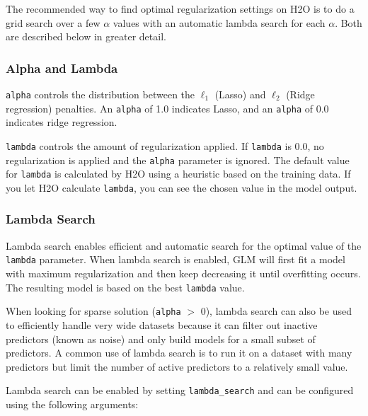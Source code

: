 The recommended way to find optimal regularization settings on H2O is to do
a grid search over a few $\alpha$ values with an automatic lambda search for each $\alpha$. Both are described
below in greater detail.

\subsubsection{Alpha and Lambda}

\texttt{alpha} controls the distribution between  the $\ell_1$ (Lasso) and  $\ell_2$ (Ridge regression) penalties.  An \texttt{alpha} 
of 1.0 indicates Lasso, and an \texttt{alpha} of 0.0 indicates ridge regression.

\texttt{lambda} controls the amount of regularization applied.  If \texttt{lambda} is 0.0, no 
regularization is applied and the \texttt{alpha} parameter is ignored.  The default value for \texttt{lambda} is
calculated by H2O using a heuristic based on the training data.  If you let H2O calculate \texttt{lambda}, you can see the chosen value in the model output.

\subsubsection{Lambda Search}
Lambda search enables efficient and automatic search for the optimal value of the \texttt{lambda} parameter. When lambda search is enabled, GLM will first fit a model with maximum regularization and then keep decreasing it until overfitting occurs. The resulting model is based on the best \texttt{lambda} value. 

When looking for sparse solution (\texttt{alpha} $>$ 0), lambda search can also be used to efficiently handle very wide datasets because it can filter out inactive predictors (known as noise) and only build models for a small subset of predictors. A common use of lambda search is to run it on a dataset with many predictors but limit the number of active predictors to a relatively small value.  

Lambda search can be enabled by setting \texttt{lambda\_search} and can be configured using the following arguments:

